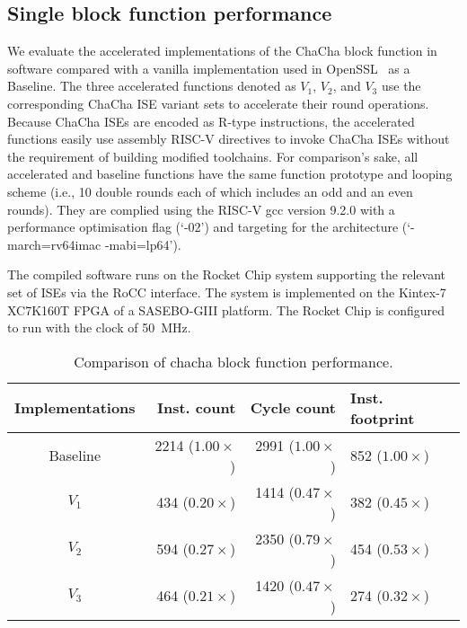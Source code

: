 
\subsection{Single block function performance}
\label{sec:eval:blk}
We evaluate the accelerated implementations of the ChaCha block function in software compared with a vanilla implementation used in OpenSSL~\cite{OpenSSL} as a Baseline. The three accelerated functions denoted as $V_1$, $V_2$, and $V_3$ use the corresponding ChaCha ISE variant sets to accelerate their round operations. 
Because ChaCha ISEs are encoded as R-type instructions, the accelerated functions easily use assembly RISC-V directives  to invoke ChaCha ISEs without the requirement of building modified toolchains.   
For comparison's sake, all accelerated and baseline functions have the same function prototype and looping scheme (i.e., 10 double rounds each of which includes an odd and an even rounds). 
They are complied using the RISC-V gcc version 9.2.0 with a performance optimisation flag (`-02') and targeting for the  architecture (`-march=rv64imac -mabi=lp64'). 

The compiled software runs on the Rocket Chip system supporting the relevant set of ISEs via the RoCC interface.
The system is implemented on the Kintex-7 XC7K160T FPGA of a SASEBO-GIII platform.
The Rocket Chip is configured to run with the clock of 50~MHz.


\begin{table}[b]
\caption{Comparison of chacha block function performance.}
\centering
\label{tab:res:sw:perf1}
\begin{tabular}{crrl}
\toprule            
Implementations        & Inst. count   & Cycle count & Inst. footprint\\

\midrule
Baseline & 2214 ($1.00\times$)     & 2991 ($1.00\times$) &  852 ($1.00\times$)\\
 $V_1$   &  434 ($0.20\times$)     & 1414 ($0.47\times$) &  382 ($0.45\times$)\\
 $V_2$   &  594 ($0.27\times$)     & 2350 ($0.79\times$) &  454 ($0.53\times$)\\
 $V_3$   &  464 ($0.21\times$)     & 1420 ($0.47\times$) &  274 ($0.32\times$)\\

\bottomrule
\end{tabular}
\end{table}


